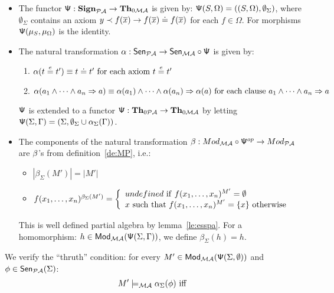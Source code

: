\documentclass[10pt]{article}
\begin{document}
\begin{PROOF}
\begin{itemize}
\item The functor ${\sf {\Psi}}: {\bf Sign}_{{\mathcal{PA}}} \to {\bf Th}_{0{\mathcal{MA}}}$ is given
by: ${\sf {\Psi}}(S,\Omega)= ((S,\Omega),\emptyset_{\Sigma})$, where
$\emptyset_{\Sigma}$ contains an axiom $y \prec f(\overline{x}) \to
f(\overline{x}) \mathrel{\dot{=} } f(\overline{x})$ for each $f\in\Omega$. For  morphisms
${\sf {\Psi}}(\mu_S,\mu_{\Omega})$ is the identity.  
\item The natural transformation
$\alpha: {\sf {Sen}}_{{\mathcal{PA}}} \to {\sf {Sen}}_{{\mathcal{MA}}} \circ {\sf {\Psi}}$ is given by:
   \begin{enumerate} 
    \item $\alpha(t \stackrel{e}{=} t') \equiv t \mathrel{\dot{=} } t'\mbox{ for
each axiom }t \stackrel{e}{=} t'$ 
    \item $\alpha(a_1 \wedge \cdots \wedge a_n
\Rightarrow a) \equiv \alpha(a_1) \wedge \cdots \wedge \alpha(a_n)
\Rightarrow \alpha(a)\mbox{ for each clause }a_1 \wedge \cdots \wedge
a_n \Rightarrow a$ 
   \end{enumerate}
${\sf {\Psi}}$ is extended to a functor 
${\sf {\Psi}}: {\bf Th}_{0{\mathcal{PA}}} \to {\bf Th}_{0{\mathcal{MA}}}$ by letting
${\sf {\Psi}}(\Sigma,\Gamma) = (\Sigma,\emptyset_\Sigma\cup\alpha_\Sigma(\Gamma))$.
%
\item 
The components of the natural transformation $\beta: Mod_{{\mathcal{MA}}}
	\circ {\sf {\Psi}}^{op} \to Mod_{{\mathcal{PA}}}$ are ${\sf {\beta}}$'s from definition~\ref{de:MP}, i.e.:
\begin{itemize}
	\item $|\beta_{\Sigma}(M')| = |M'|$
	\item $f(x_1, \ldots ,x_n)^{\beta_{\Sigma}(M')} = \left\{\begin{array}{l}
	  undefined\ {\rm if}\ f(x_1, \ldots ,x_n)^{M'}=\emptyset \\
          x\ {\rm such\ that}\ f(x_1, \ldots ,x_n)^{M'}=\{x\}\ {\rm otherwise} \end{array}\right.$
    \end{itemize}
This is well defined partial algebra by lemma~\ref{le:esspa}.
For a homomorphism:  $h \in {\sf {Mod}}_{{\mathcal{MA}}}({\sf {\Psi}}(\Sigma,\Gamma))$, we define $\beta_\Sigma(h) = h$.
\end{itemize}
%
We verify the ``thruth'' condition: for every $M'\in{\sf {Mod}}_{{\mathcal{MA}}}({\sf {\Psi}}(\Sigma,\emptyset))$ and $\phi \in {\sf {Sen}}_{{\mathcal{PA}}}(\Sigma)$:
\begin{equation}
\label{eq:tcp} 
M' \models_{\inst{MA}} \alpha_{\Sigma}(\phi) \mbox{ iff } 

\end{equation}
\end{PROOF}
\end{document}
